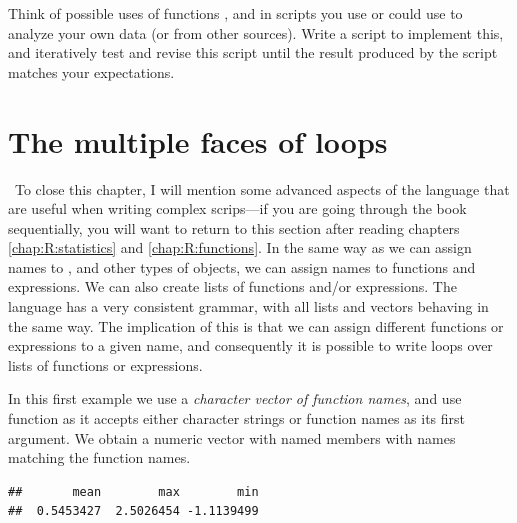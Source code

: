 \documentclass[krantz2]{krantz}\usepackage{knitr}
\begin{document}
\begin{advplayground}
Think of possible uses of functions ,  and  in scripts you use or could use to analyze your own data (or from other sources). Write a script to implement this, and iteratively test and revise this script until the result produced by the script matches your expectations.
\end{advplayground}

\section{The multiple faces of loops}\label{sec:R:faces:of:loops}

\ilAdvanced\ To close this chapter, I will mention some advanced aspects of the \Rlang language that are useful when writing complex scrips---if you are going through the book sequentially, you will want to return to this section after reading chapters \ref{chap:R:statistics} and \ref{chap:R:functions}. In the same way as we can assign names to ,  and other types of objects, we can assign names to functions and expressions. We can also create lists of functions and/or expressions. The \Rlang language has a very consistent grammar, with all lists and vectors behaving in the same way. The implication of this is that we can assign different functions or expressions to a given name, and consequently it is possible to write loops over lists of functions or expressions.

In this first example we use a \emph{character vector of function names}, and use function  as it accepts either character strings or function names as its first argument. We obtain a numeric vector with named members with names matching the function names.

\begin{knitrout}\footnotesize
{}\color{fgcolor}\begin{kframe}
\begin{alltt}
 \hlkwb{<-} \hlstd{(}\hlstd{)}
 \hlkwb{<-} \hlstd{()}
 \hlkwb{<-} \hlstd{(}\hlstd{,} \hlstd{,} \hlstd{)}
   
    \hlkwb{<-}  
   \hlstd{\}}
\end{alltt}
\begin{verbatim}
##       mean        max        min 
##  0.5453427  2.5026454 -1.1139499
\end{verbatim}
\end{kframe}
\end{knitrout}
\end{document}

